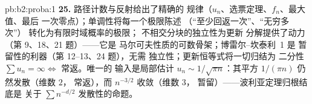 \begin{solution}{pb:b2:proba:1}
\textbf{25.} 路径计数与反射给出了精确的
规律（$u_n$、选票定理、$f_n$、最大值、最后
一次零点）；单调性将每一个极限陈述
（“至少回返一次”、“无穷多次”）
转化为有限时域概率的极限；
不相交分块的独立性为更新
分解提供了动力（第 9、18、21 题）——它是
马尔可夫性质的可数骨架；博雷尔--坎泰利~1 是
暂留性的利器（第 12--13、24 题），无需
独立性；更新恒等式将一切归结为
二分性 $\sum u_n = \infty \iff$ 常返。唯一的
输入是局部估计 $u_n \sim 1/\sqrt{\pi
n}$：其平方 $1/(\pi n)$ 仍然发散（维数 $2$，
常返），而 $n^{-3/2}$ 收敛（维数 $3$，
暂留）——波利亚定理归根结底是
关于 $\sum n^{-d/2}$ 发散性的命题。
\end{solution}
